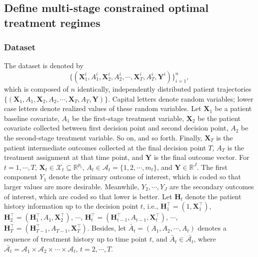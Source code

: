 \documentclass{article}
\newcommand{\itl}{\intercal}
\newcommand{\bs}{ \boldsymbol}
\newcommand{\mb}{\mathbb}
\newcommand{\ml}{\mathcal}
\newcommand{\br}{\bar}
\begin{document}
\subsection{Define multi-stage constrained optimal treatment regimes }
\subsubsection{Dataset}
 The dataset is denoted by $$\{(\bs{X}_{1}^{i}, A_{1}^{i},\bs{X}_{2}^{i}, A_{2}^{i}, \cdots, \bs{X}_{T}^{i}, A_{T}^{i}, \bs{Y}^{i})\}_{i=1}^{n},$$ which is composed of $n$ identically, independently distributed patient trajectories\\ $\{(\bs{X}_{1}, A_{1},\bs{X}_{2}, A_{2}, \cdots, \bs{X}_{T}, A_{T}, \bs{Y})\}$. Capital letters denote random variables; lower case letters denote realized values of these random variables. Let $\bs{X}_1$ be a patient baseline covariate, $A_1$ be the first-stage treatment variable, $\bs{X}_2$ be the patient covariate collected between first decision point and second decision point, $A_2$ be the second-stage treatment variable. So on, and so forth. Finally, $\bs{X}_T$ is the patient intermediate outcomes collected at the final decision point $T$, $A_T$ is the treatment assignment at that time point, and $\bs{Y}$ is the final outcome vector. For $t = 1, \cdots, T$, $\bs{X}_t\in \bs{\ml{X}}_t \subseteq{\mb{R}^{p_t}}$, $A_{t} \in \ml{A}_t = \{ 1, 2, \cdots, m_t\}$, and $\bs{Y} \in \mb{R}^J$. The first component $Y_1$ denote the primary outcome of interest, which is coded so that larger values are more desirable. Meanwhile, $Y_2, \cdots, Y_J$ are the secondary outcomes of interest, which are coded so that lower is better. Let $\bs{H}_t$ denote the patient history information up to the decision point $t$, i.e., $\bs{H}^\itl_1 = (1, \bs{X}^\itl_1)$, $\bs{H}^\itl_2 = ( \bs{H}^\itl_1, A_1, \bs{X}^\itl_2)$, $\cdots$,  $\bs{H}^\itl_t = (\bs{H}^\itl_{t-1}, A_{t-1}, \bs{X}^\itl_t)$, $\cdots$, $\bs{H}^\itl_T = (\bs{H}^\itl_{T-1}, A_{T-1}, \bs{X}^\itl_T)$. Besides, let $\br{A}_t = (A_1, A_2, \cdots, A_t)$ denotes a sequence of treatment history up to time point $t$, and $\br{A}_t \in \br{\ml{A}_t}$, where $\br{\ml{A}_t} = \ml{A}_1 \times \ml{A}_2 \times \cdots \times \ml{A}_t$, $t =2 , \cdots, T$. %
 
\end{document}

